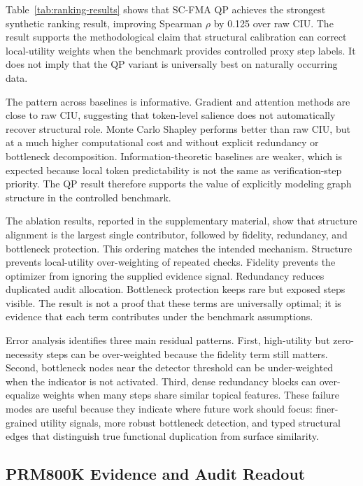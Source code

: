 \documentclass[a4paper,fleqn]{cas-sc}
\begin{document}
Table~\ref{tab:ranking-results} shows that SC-FMA QP achieves the strongest synthetic ranking result, improving Spearman $\rho$ by 0.125 over raw CIU. The result supports the methodological claim that structural calibration can correct local-utility weights when the benchmark provides controlled proxy step labels. It does not imply that the QP variant is universally best on naturally occurring data.

The pattern across baselines is informative. Gradient and attention methods are close to raw CIU, suggesting that token-level salience does not automatically recover structural role. Monte Carlo Shapley performs better than raw CIU, but at a much higher computational cost and without explicit redundancy or bottleneck decomposition. Information-theoretic baselines are weaker, which is expected because local token predictability is not the same as verification-step priority. The QP result therefore supports the value of explicitly modeling graph structure in the controlled benchmark.

The ablation results, reported in the supplementary material, show that structure alignment is the largest single contributor, followed by fidelity, redundancy, and bottleneck protection. This ordering matches the intended mechanism. Structure prevents local-utility over-weighting of repeated checks. Fidelity prevents the optimizer from ignoring the supplied evidence signal. Redundancy reduces duplicated audit allocation. Bottleneck protection keeps rare but exposed steps visible. The result is not a proof that these terms are universally optimal; it is evidence that each term contributes under the benchmark assumptions.

Error analysis identifies three main residual patterns. First, high-utility but zero-necessity steps can be over-weighted because the fidelity term still matters. Second, bottleneck nodes near the detector threshold can be under-weighted when the indicator is not activated. Third, dense redundancy blocks can over-equalize weights when many steps share similar topical features. These failure modes are useful because they indicate where future work should focus: finer-grained utility signals, more robust bottleneck detection, and typed structural edges that distinguish true functional duplication from surface similarity.

\subsection{PRM800K Evidence and Audit Readout}
\end{document}

